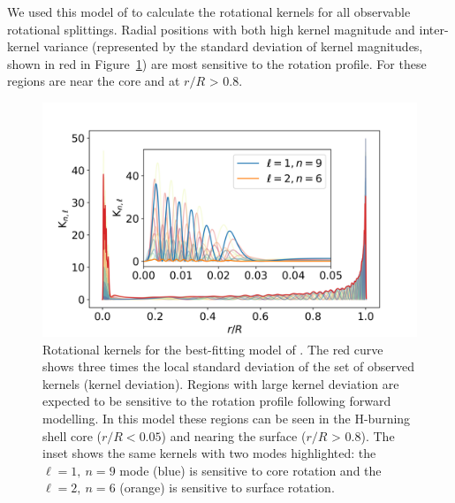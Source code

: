 
We  used this model of \thestar{} to calculate the rotational kernels for all observable rotational splittings. Radial positions with both high kernel magnitude and inter-kernel variance (represented by the standard deviation of kernel magnitudes, shown in red in Figure~\ref{fig:kern}) are most sensitive to the rotation profile. For \thestar{} these regions are near the core and at $r/R$ > $0.8$.

\begin{figure}
    \includegraphics[width=\textwidth]{Figures/subgiant_chapter_figures/staradif.png}
    \caption[Rotational kernels for the best-fitting model of KIC~12508433.]{Rotational kernels for the best-fitting model of \thestar{}. The red curve shows three times the local standard deviation of the set of observed kernels (kernel deviation). Regions with large kernel deviation are expected to be sensitive to the rotation profile following forward modelling. In this model these regions can be seen in the H-burning shell core ($r/R<0.05$) and nearing the surface ($r/R$ > $0.8$). The inset shows the same kernels with two modes highlighted: the $\ell = 1,\ n=9$ mode (blue) is sensitive to core rotation and the $\ell = 2,\ n = 6$ (orange) is sensitive to surface rotation.}
    \label{fig:kern}
\end{figure}

